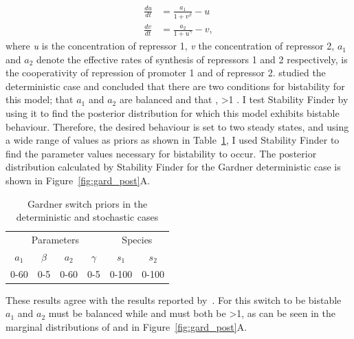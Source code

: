 \begin{align}
\frac{du}{dt} &= \frac{a_1}{1+v^{\beta}} - u\\
\frac{dv}{dt} &= \frac{a_2}{1+u^{\gamma }} - v,
\end{align}
\noindent where \textit{u} is the concentration of repressor 1, \textit{v} the concentration of repressor 2, $a_1$ and $a_2$ denote the effective rates of synthesis of repressors 1 and 2 respectively, \textbeta{} is the cooperativity of repression of promoter 1 and \textgamma{} of repressor 2. \textcite{Gardner:2000vha} studied the deterministic case and concluded that there are two conditions for bistability for this model; that $a_1$ and $a_2$ are balanced and that \textbeta{}, \textgamma{}\textgreater 1 \autocite{Gardner:2000vha}. I test Stability Finder by using it to find the posterior distribution for which this model exhibits bistable behaviour. Therefore, the desired behaviour is set to two steady states, and using a wide range of values as priors as shown in Table~\ref{tab:gard_det_stoch}, I used Stability Finder to find the parameter values necessary for bistability to occur. The posterior distribution calculated by Stability Finder for the Gardner deterministic case is shown in Figure~\ref{fig:gard_post}A.

\begin{table}[htbp]
\centering
\caption{Gardner switch priors in the deterministic and stochastic cases}
\label{tab:gard_det_stoch}
\begin{tabular}{@{}cccccc@{}}
\toprule
\multicolumn{4}{c}{Parameters}                          & \multicolumn{2}{c}{Species} \\ \cmidrule(lr){1-4}
\cmidrule(lr){5-6}
$a_1$ & $\beta$ & $a_2$ & \multicolumn{1}{c}{$\gamma$} & $s_1$        & $s_2$        \\
0-60  & 0-5     & 0-60  & 0-5                           & 0-100        & 0-100        \\ \bottomrule
\end{tabular}
\end{table}

These results agree with the results reported by~\textcite{Gardner:2000vha}. For this switch to be bistable $a_1$ and $a_2$ must be balanced while \textbeta{} and \textgamma{} must both be \textgreater 1, as can be seen in the marginal distributions of \textbeta{} and \textgamma{} in Figure~\ref{fig:gard_post}A.

